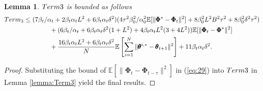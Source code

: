 \documentclass{article} %
\def\eqref#1{equation~\ref{#1}}
\theoremstyle{plain}
\newtheorem{lemma}[theorem]{Lemma}
\theoremstyle{definition}
\theoremstyle{remark}
\renewcommand{\eqref}[1]{(\ref{#1})}
\begin{document}
{\begin{lemma}\label{lemma:Term3_final}
    $\textnormal{Term 3}$ is bounded as follows
    \begin{align*}
      Term_3&\leq (7\beta_t/\alpha_t+2\beta_t\alpha_t L^2+6\beta_t\alpha_t\delta^2)(4\tau^2\beta_0^2/\alpha_0^2\mathbb{E}[\|\pmb{\Phi}^*-\pmb{\Phi}_{t}\|^2]+8\beta_0^2L^2B^2\tau^2 +8\beta_0^2\delta^2\tau^2)\allowdisplaybreaks\\
    &\qquad\qquad+(6\beta_t/\alpha_t+6\beta_t\alpha_t\delta^2(1+L^2) +4\beta_t\alpha_tL^2(3+4L^2))\mathbb{E}[\|\pmb{\Phi}_t-\pmb{\Phi}^*\|^2]\nonumber\allowdisplaybreaks\\
    &\qquad\qquad+\frac{16\beta_t \alpha_t L^2+6\beta_t\alpha_t\delta^2}{N}\mathbb{E}\left[\sum_{i=1}^N\|\pmb{\theta}^{i,*}-\pmb{\theta}_{t+1}\|^2\right]+11\beta_t\alpha_t\delta^2.
\end{align*}
\end{lemma}
\begin{proof}
Substituting the bound of $
   \mathbb{E}[\|\pmb{\Phi}_t-\pmb{\Phi}_{t-\tau}\|^2]
$ in \eqref{eq:29} into $\textnormal{Term 3}$  in Lemma \ref{lemma:Term3} yield the final results.
\end{proof}
 

}
\end{document}
